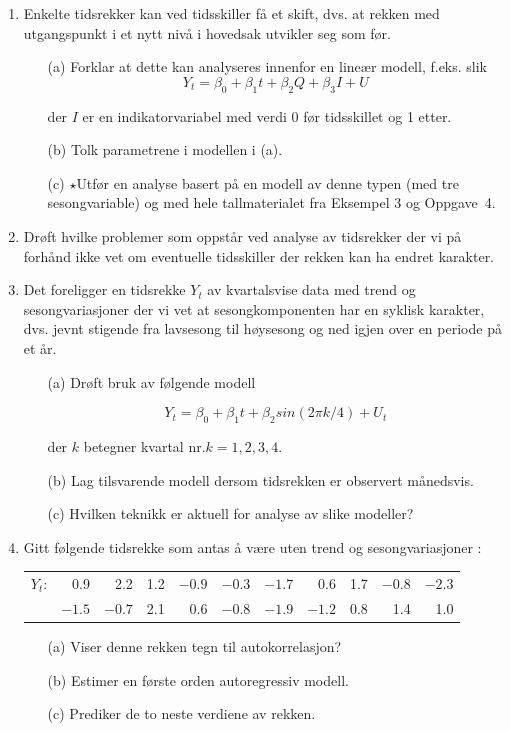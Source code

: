 \begin{enumerate}
\item Enkelte tidsrekker kan ved tidsskiller få et skift, dvs. at rekken
 med utgangspunkt i et nytt nivå i hovedsak utvikler seg som før.
\begin{itemize}
\item[(a)] Forklar at dette kan analyseres innenfor en lineær modell,
           f.eks. slik
      \[Y_t={\beta}_0+{\beta}_1 t+{\beta}_2 Q+{\beta}_3 I+U \]

\noindent der $I$ er en indikatorvariabel med verdi 0 før tidsskillet
         og 1 etter.
\item[(b)] Tolk parametrene i modellen i (a).
\item[(c)] $\star$Utfør en analyse basert på en modell av denne typen
       (med tre sesongvariable) og med hele tallmaterialet fra Eksempel 3 og
      Oppgave~4.
\end{itemize}

\item Drøft hvilke problemer som oppstår ved analyse av tidsrekker der
    vi på forhånd ikke vet om eventuelle tidsskiller der rekken kan ha 
    endret karakter.

\item Det foreligger en tidsrekke $Y_t$ av kvartalsvise data med trend og
    sesongvariasjoner der vi vet at sesongkomponenten har en syklisk karakter,
    dvs. jevnt stigende fra lavsesong til høysesong og ned igjen over en
    periode på et år.
\begin{itemize}
\item[(a)] Drøft bruk av følgende modell

      \[Y_t={\beta}_0+{\beta}_1 t+{\beta}_2 sin(2\pi k/4)+U_t \]

\noindent der $k$ betegner kvartal nr.$k = 1, 2, 3, 4.$
\item[(b)] Lag tilsvarende modell dersom tidsrekken er observert 
           månedsvis.
\item[(c)] Hvilken teknikk er aktuell for analyse av slike modeller?
\end{itemize}

\item Gitt følgende tidsrekke som antas å være uten trend og 
      sesongvariasjoner :
\begin{center} \addtolength{\tabcolsep}{-0.2\tabcolsep}
\begin{tabular}{lrrrrrrrrrr}
$Y_t$:& 0.9 & 2.2 & 1.2 &$-0.9$&$-0.3$&$-1.7$& 0.6 & 1.7 &$-0.8$&$-2.3$ \\
      &$-1.5$&$-0.7$&2.1&0.6&$-0.8$&$-1.9$&$-1.2$& 0.8 & 1.4 & 1.0 \\
\end{tabular}
\end{center}
\begin{itemize}
\item[(a)] Viser denne rekken tegn til autokorrelasjon?
\item[(b)] Estimer en første orden autoregressiv modell.
\item[(c)] Prediker de to neste verdiene av rekken.
\end{itemize}


\end{enumerate}
